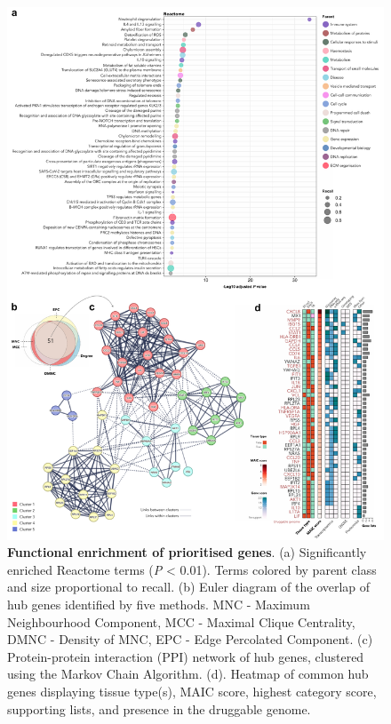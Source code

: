 \documentclass[
  11,
  a4paper,
]{article}
\begin{document}
\begin{figure}

{\centering \includegraphics{./img/Figure_3.png}

}

\caption{\label{fig-fig3}\textbf{Functional enrichment of prioritised
genes}. (a) Significantly enriched Reactome terms (\emph{P} \textless{}
0.01). Terms colored by parent class and size proportional to recall.
(b) Euler diagram of the overlap of hub genes identified by five
methods. MNC - Maximum Neighbourhood Component, MCC - Maximal Clique
Centrality, DMNC - Density of MNC, EPC - Edge Percolated Component. (c)
Protein-protein interaction (PPI) network of hub genes, clustered using
the Markov Chain Algorithm. (d). Heatmap of common hub genes displaying
tissue type(s), MAIC score, highest category score, supporting lists,
and presence in the druggable genome.}

\end{figure}
\end{document}
